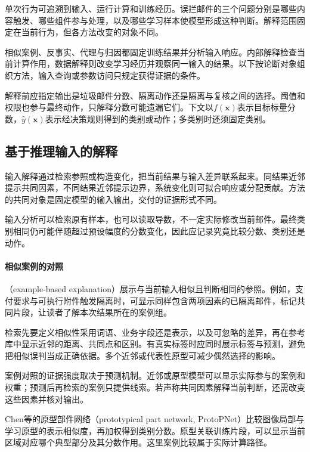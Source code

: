 单次行为可追溯到输入、运行计算和训练经历。误拦邮件的三个问题分别是哪些内容触发、哪些组件参与处理，以及哪些学习样本使模型形成这种判断。解释范围固定在当前行为，但各方法改变的对象不同。

相似案例、反事实、代理与归因都固定训练结果并分析输入响应。内部解释检查当前计算作用，数据解释则改变学习经历并观察同一输入的结果。以下按论断对象组织方法，输入查询或参数访问只规定获得证据的条件。

解释前应指定输出是垃圾邮件分数、隔离动作还是隔离与复核之间的选择。阈值和权限也参与最终动作，只解释分数可能遗漏它们。下文以$f(\bm x)$表示目标标量分数，$\hat y(\bm x)$表示经决策规则得到的类别或动作；多类别时还须固定类别。

\subsection{基于推理输入的解释}
\label{sec:interpretability-local-input}

输入解释通过检索参照或构造变化，把当前结果与输入差异联系起来。同结果近邻提示共同因素，不同结果近邻提示边界，系统变化则可拟合响应或分配贡献。方法的共同对象是固定模型的输入输出，交付的证据形式不同。

输入分析可以检索原有样本，也可以读取导数，不一定实际修改当前邮件。最终类别相同仍可能伴随超过预设幅度的分数变化，因此应记录究竟比较分数、类别还是动作。

\paragraph{相似案例的对照}
\label{sec:interpretability-local-examples}

（example-based explanation）展示与当前输入相似且判断相同的参照。例如，支付要求与可执行附件触发隔离时，可显示同样包含两项因素的已隔离邮件，标记共同片段，让读者了解本次结果所在的案例组。

检索先要定义相似性采用词语、业务字段还是表示，以及可忽略的差异，再在参考库中显示近邻的距离、共同点和区别。有真实标签时应同时展示标签与预测，避免把相似误判当成正确依据。多个近邻或代表性原型可减少偶然选择的影响。

案例对照的证据强度取决于预测机制。近邻或原型模型可以显示实际参与的案例和权重；预测后再检索的案例只提供线索。若声称共同因素解释当前判断，还需改变这些因素并核对输出。

Chen等的原型部件网络（prototypical part network, ProtoPNet）比较图像局部与学习原型的表示相似度，再加权得到类别分数。原型关联训练片段，可以显示当前区域对应哪个典型部分及其分数作用。这里案例比较属于实际计算路径。

